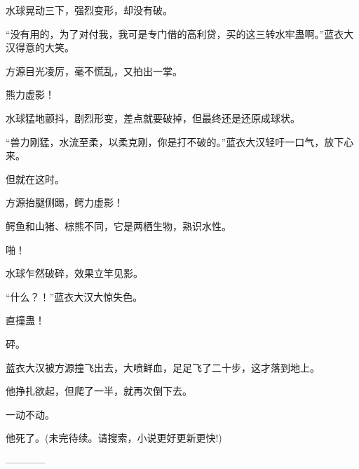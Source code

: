 \begin{this_body}
水球晃动三下，强烈变形，却没有破。

“没有用的，为了对付我，我可是专门借的高利贷，买的这三转水牢蛊啊。”蓝衣大汉得意的大笑。

方源目光凌厉，毫不慌乱，又拍出一掌。

熊力虚影！

水球猛地颤抖，剧烈形变，差点就要破掉，但最终还是还原成球状。

“兽力刚猛，水流至柔，以柔克刚，你是打不破的。”蓝衣大汉轻吁一口气，放下心来。

但就在这时。

方源抬腿侧踢，鳄力虚影！

鳄鱼和山猪、棕熊不同，它是两栖生物，熟识水性。

啪！

水球乍然破碎，效果立竿见影。

“什么？！”蓝衣大汉大惊失色。

直撞蛊！

砰。

蓝衣大汉被方源撞飞出去，大喷鲜血，足足飞了二十步，这才落到地上。

他挣扎欲起，但爬了一半，就再次倒下去。

一动不动。

他死了。(未完待续。请搜索，小说更好更新更快!)

------------

\end{this_body}


